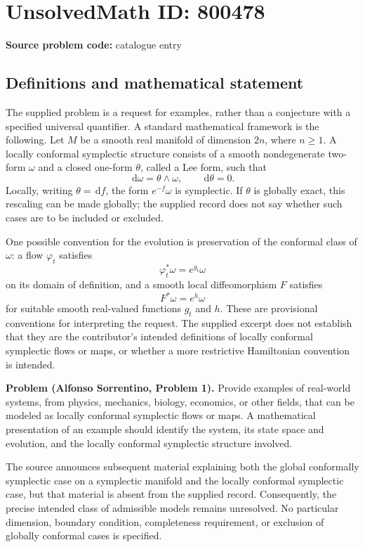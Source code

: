 \documentclass[11pt]{article}
\newcommand{\dd}{\,\mathrm{d}}
\begin{document}
\section*{UnsolvedMath ID: 800478}
\textbf{Source problem code:} catalogue entry
\subsection{Definitions and mathematical statement}
The supplied problem is a request for examples, rather than a conjecture with a specified universal quantifier. A standard mathematical framework is the following. Let \(M\) be a smooth real manifold of dimension \(2n\), where \(n\geq 1\). A locally conformal symplectic structure consists of a smooth nondegenerate two-form \(\omega\) and a closed one-form \(\theta\), called a Lee form, such that
\[
\dd\omega=\theta\wedge\omega,\qquad \dd\theta=0.
\]
Locally, writing \(\theta=\dd f\), the form \(e^{-f}\omega\) is symplectic. If \(\theta\) is globally exact, this rescaling can be made globally; the supplied record does not say whether such cases are to be included or excluded.

One possible convention for the evolution is preservation of the conformal class of \(\omega\): a flow \(\varphi_t\) satisfies
\[
\varphi_t^*\omega=e^{g_t}\omega
\]
on its domain of definition, and a smooth local diffeomorphism \(F\) satisfies
\[
F^*\omega=e^h\omega
\]
for suitable smooth real-valued functions \(g_t\) and \(h\). These are provisional conventions for interpreting the request. The supplied excerpt does not establish that they are the contributor's intended definitions of locally conformal symplectic flows or maps, or whether a more restrictive Hamiltonian convention is intended.

\textbf{Problem (Alfonso Sorrentino, Problem 1).} Provide examples of real-world systems, from physics, mechanics, biology, economics, or other fields, that can be modeled as locally conformal symplectic flows or maps. A mathematical presentation of an example should identify the system, its state space and evolution, and the locally conformal symplectic structure involved.

The source announces subsequent material explaining both the global conformally symplectic case on a symplectic manifold and the locally conformal symplectic case, but that material is absent from the supplied record. Consequently, the precise intended class of admissible models remains unresolved. No particular dimension, boundary condition, completeness requirement, or exclusion of globally conformal cases is specified.
\end{document}
